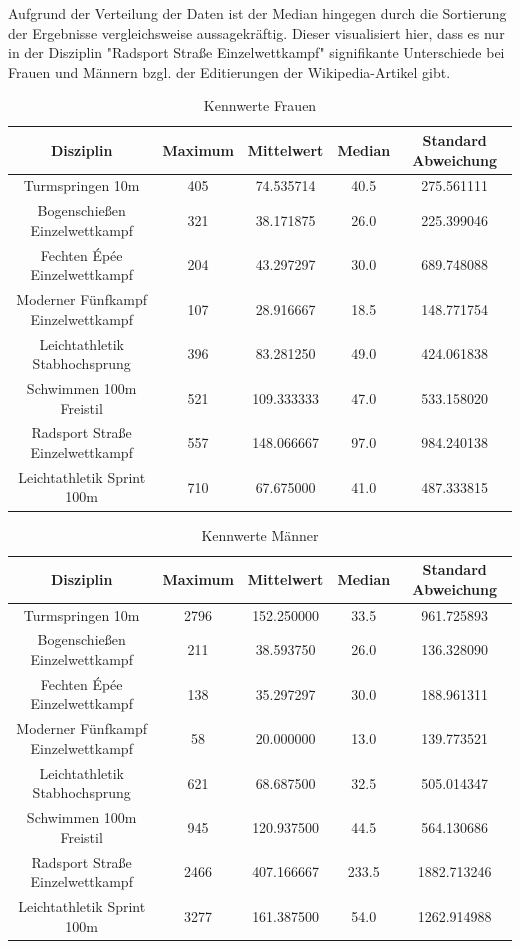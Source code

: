 \documentclass[11pt]{article}
\begin{document}
Aufgrund der Verteilung der Daten ist der Median hingegen durch die Sortierung der Ergebnisse vergleichsweise aussagekräftig. Dieser visualisiert hier, dass es nur in der Disziplin "Radsport Straße Einzelwettkampf" signifikante Unterschiede bei Frauen und Männern bzgl. der Editierungen der Wikipedia-Artikel gibt.

\begin{table}
\begin{tabular}{ c|c|c|c|c }
  Disziplin & Maximum & Mittelwert & Median & Standard Abweichung \\
  \hline
  Turmspringen 10m & 405 & 74.535714 & 40.5 & 275.561111 \\
  Bogenschießen Einzelwettkampf & 321 & 38.171875 & 26.0 & 225.399046 \\
  Fechten Épée Einzelwettkampf & 204 & 43.297297 & 30.0 & 689.748088 \\
  Moderner Fünfkampf Einzelwettkampf & 107 & 28.916667 & 18.5 & 148.771754 \\
  Leichtathletik Stabhochsprung & 396 & 83.281250 & 49.0 & 424.061838\\
  Schwimmen 100m Freistil & 521 & 109.333333 & 47.0 & 533.158020\\
  Radsport Straße Einzelwettkampf & 557 & 148.066667 & 97.0 & 984.240138\\
  Leichtathletik Sprint 100m & 710 & 67.675000 & 41.0 & 487.333815\\
\end{tabular}
\caption{\label{tab:editcount_kpi_women}Kennwerte Frauen}
\end{table}

\begin{table}
\begin{tabular}{ c|c|c|c|c }
  Disziplin & Maximum & Mittelwert & Median & Standard Abweichung \\
  \hline
  Turmspringen 10m & 2796 & 152.250000 & 33.5 & 961.725893 \\
  Bogenschießen Einzelwettkampf & 211 & 38.593750 & 26.0 & 136.328090\\
  Fechten Épée Einzelwettkampf & 138 & 35.297297 & 30.0 & 188.961311 \\
  Moderner Fünfkampf Einzelwettkampf & 58 & 20.000000 & 13.0 & 139.773521\\
  Leichtathletik Stabhochsprung & 621 & 68.687500 & 32.5 & 505.014347\\
  Schwimmen 100m Freistil & 945 & 120.937500 & 44.5 & 564.130686\\
  Radsport Straße Einzelwettkampf & 2466 & 407.166667 & 233.5 & 1882.713246\\
  Leichtathletik Sprint 100m & 3277 & 161.387500 & 54.0 & 1262.914988\\
\end{tabular}
\caption{\label{tab:editcount_kpi_men}Kennwerte Männer}
\end{table}
\end{document}
